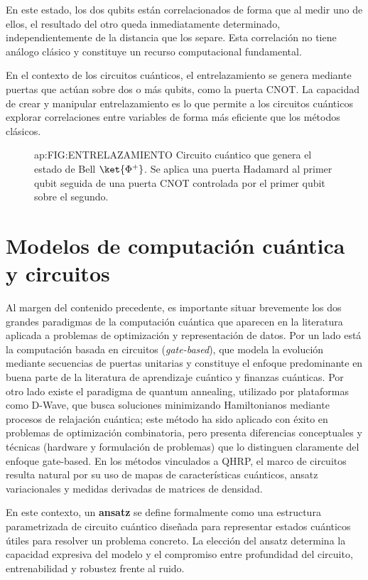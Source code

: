 En este estado, los dos qubits están correlacionados de forma que al medir uno de ellos, el resultado del otro queda inmediatamente determinado, independientemente de la distancia que los separe. Esta correlación no tiene análogo clásico y constituye un recurso computacional fundamental.

En el contexto de los circuitos cuánticos, el entrelazamiento se genera mediante puertas que actúan sobre dos o más qubits, como la puerta CNOT. La capacidad de crear y manipular entrelazamiento es lo que permite a los circuitos cuánticos explorar correlaciones entre variables de forma más eficiente que los métodos clásicos.

\begin{figure}[Estado de Bell]{ap:FIG:ENTRELAZAMIENTO}
{Circuito cuántico que genera el estado de Bell $\ket{\Phi^+}$.
Se aplica una puerta Hadamard al primer qubit seguida de una puerta CNOT
controlada por el primer qubit sobre el segundo.}
\end{figure}

\section{Modelos de computación cuántica y circuitos}
\label{ap:sec:modelos_computacion_cuantica}
Al margen del contenido precedente, es importante situar brevemente los dos grandes paradigmas de la computación cuántica que aparecen en la literatura aplicada a problemas de optimización y representación de datos. Por un lado está la computación basada en circuitos (\textit{gate-based}), que modela la evolución mediante secuencias de puertas unitarias y constituye el enfoque predominante en buena parte de la literatura de aprendizaje cuántico y finanzas cuánticas. Por otro lado existe el paradigma de quantum annealing, utilizado por plataformas como D-Wave, que busca soluciones minimizando Hamiltonianos mediante procesos de relajación cuántica; este método ha sido aplicado con éxito en problemas de optimización combinatoria, pero presenta diferencias conceptuales y técnicas (hardware y formulación de problemas) que lo distinguen claramente del enfoque gate-based. En los métodos vinculados a QHRP, el marco de circuitos resulta natural por su uso de mapas de características cuánticos, ansatz variacionales y medidas derivadas de matrices de densidad.

En este contexto, un \textbf{ansatz} se define formalmente como una estructura parametrizada de circuito cuántico diseñada para representar estados cuánticos útiles para resolver un problema concreto. La elección del ansatz determina la capacidad expresiva del modelo y el compromiso entre profundidad del circuito, entrenabilidad y robustez frente al ruido.

